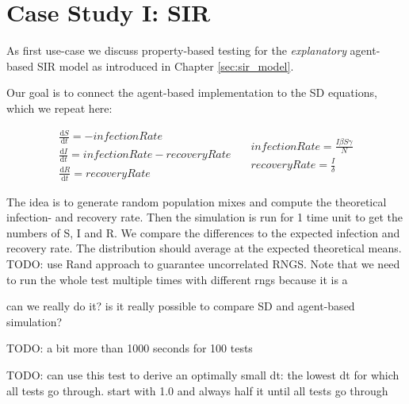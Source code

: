 \section{Case Study I: SIR}
\label{sec:case_SIR}
As first use-case we discuss property-based testing for the \textit{explanatory} agent-based SIR model as introduced in Chapter \ref{sec:sir_model}. 

Our goal is to connect the agent-based implementation to the SD equations, which we repeat here:

\begin{equation}
\begin{split}
\frac{\mathrm d S}{\mathrm d t} = -infectionRate \\
\frac{\mathrm d I}{\mathrm d t} = infectionRate - recoveryRate \\
\frac{\mathrm d R}{\mathrm d t} = recoveryRate 
\end{split}
\quad
\begin{split}
infectionRate = \frac{I \beta S \gamma}{N} \\
recoveryRate = \frac{I}{\delta} 
\end{split}
\end{equation}

The idea is to generate random population mixes and compute the theoretical infection- and recovery rate. Then the simulation is run for 1 time unit to get the numbers of S, I and R. We compare the differences to the expected infection and recovery rate. The distribution should average at the expected theoretical means. TODO: use Rand approach to guarantee uncorrelated RNGS. Note that we need to run the whole test multiple times with different rngs because it is a  

can we really do it? is it really possible to compare SD and agent-based simulation? 

TODO: a bit more than 1000 seconds for 100 tests

TODO: can use this test to derive an optimally small dt: the lowest dt for which all tests go through. start with 1.0 and always half it until all tests go through

